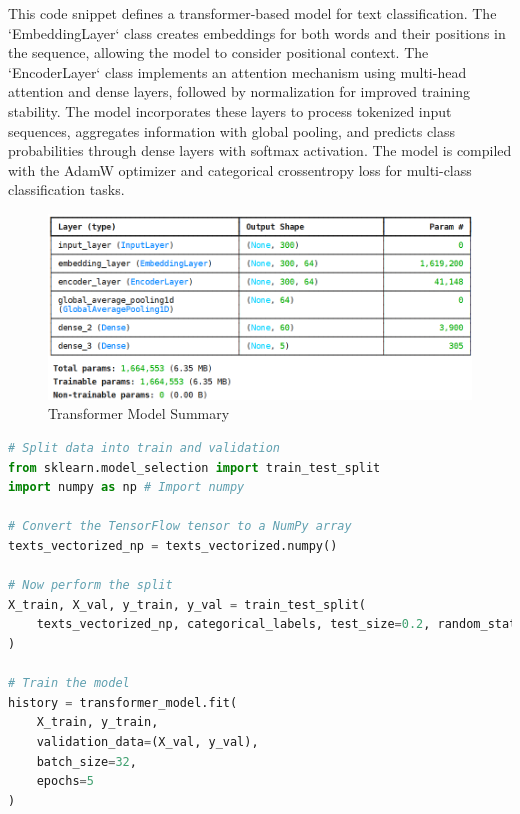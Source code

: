 \noindent
This code snippet defines a transformer-based model for text classification. The `EmbeddingLayer` class creates embeddings for both words and their positions in the sequence, allowing the model to consider positional context. The `EncoderLayer` class implements an attention mechanism using multi-head attention and dense layers, followed by normalization for improved training stability. The model incorporates these layers to process tokenized input sequences, aggregates information with global pooling, and predicts class probabilities through dense layers with softmax activation. The model is compiled with the AdamW optimizer and categorical crossentropy loss for multi-class classification tasks.

\begin{figure}[h!]  
    \centering
    \includegraphics[width=1.0\textwidth]{Images/TMODEL SUM.png}  
    \caption{Transformer Model Summary}
    \label{trans sum}  %
\end{figure}

\begin{tcolorbox}[colback=gray!5!white, colframe=gray!80!black, boxrule=0.5pt, title=Train Transformer Model]
    \begin{lstlisting}[language=Python]
# Split data into train and validation
from sklearn.model_selection import train_test_split
import numpy as np # Import numpy

# Convert the TensorFlow tensor to a NumPy array
texts_vectorized_np = texts_vectorized.numpy()

# Now perform the split
X_train, X_val, y_train, y_val = train_test_split(
    texts_vectorized_np, categorical_labels, test_size=0.2, random_state=42
)

# Train the model
history = transformer_model.fit(
    X_train, y_train,
    validation_data=(X_val, y_val),
    batch_size=32,
    epochs=5
)
    \end{lstlisting}
\end{tcolorbox}


